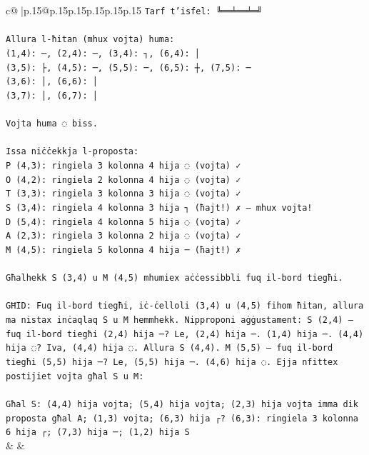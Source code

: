 \documentclass{article}
\begin{document}
{\begin{supertabular}{c@{$\;$}|p{.15\linewidth}@{}p{.15\linewidth}p{.15\linewidth}p{.15\linewidth}p{.15\linewidth}p{.15\linewidth}}
{{{\texttt{Tarf t'isfel: ╚══╧══╧═╝} \\
\\ 
\texttt{Allura l{-}ħitan (mhux vojta) huma:} \\
\texttt{(1,4): ─, (2,4): ─, (3,4): ┐, (6,4): │} \\
\texttt{(3,5): ├, (4,5): ─, (5,5): ─, (6,5): ┼, (7,5): ─} \\
\texttt{(3,6): │, (6,6): │} \\
\texttt{(3,7): │, (6,7): │} \\
\\ 
\texttt{Vojta huma ◌ biss.} \\
\\ 
\texttt{Issa niċċekkja l{-}proposta:} \\
\texttt{P (4,3): ringiela 3 kolonna 4 hija ◌ (vojta) ✓} \\
\texttt{O (4,2): ringiela 2 kolonna 4 hija ◌ (vojta) ✓} \\
\texttt{T (3,3): ringiela 3 kolonna 3 hija ◌ (vojta) ✓} \\
\texttt{S (3,4): ringiela 4 kolonna 3 hija ┐ (ħajt!) ✗ — mhux vojta!} \\
\texttt{D (5,4): ringiela 4 kolonna 5 hija ◌ (vojta) ✓} \\
\texttt{A (2,3): ringiela 3 kolonna 2 hija ◌ (vojta) ✓} \\
\texttt{M (4,5): ringiela 5 kolonna 4 hija ─ (ħajt!) ✗} \\
\\ 
\texttt{Għalhekk S (3,4) u M (4,5) mhumiex aċċessibbli fuq il{-}bord tiegħi.} \\
\\ 
\texttt{GĦID: Fuq il{-}bord tiegħi, iċ{-}ċelloli (3,4) u (4,5) fihom ħitan, allura ma nistax inċaqlaq S u M hemmhekk. Nipproponi aġġustament: S (2,4) — fuq il{-}bord tiegħi (2,4) hija ─? Le, (2,4) hija ─. (1,4) hija ─. (4,4) hija ◌? Iva, (4,4) hija ◌. Allura S (4,4). M (5,5) — fuq il{-}bord tiegħi (5,5) hija ─? Le, (5,5) hija ─. (4,6) hija ◌. Ejja nfittex postijiet vojta għal S u M:} \\
\\ 
\texttt{Għal S: (4,4) hija vojta; (5,4) hija vojta; (2,3) hija vojta imma dik proposta għal A; (1,3) vojta; (6,3) hija ┌? (6,3): ringiela 3 kolonna 6 hija ┌; (7,3) hija ─; (1,2) hija S} \\
            }
        }
    }
    & & \\ \\


\end{supertabular}}
\end{document}

